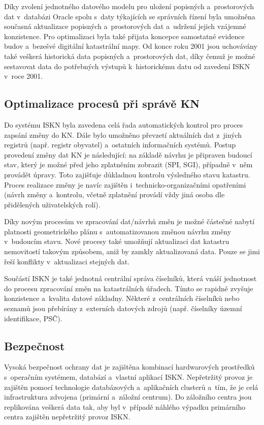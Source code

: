 \documentclass[a4paper,12pt,oneside]{book}
\begin{document}
Díky zvolení jednotného datového modelu pro uložení popisných
a~prostorových dat v~databázi Oracle spolu s~daty týkajících se
správních řízení byla umožněna současná aktualizace popisných
a~prostorových dat a~udržení jejich vzájemné konzistence. Pro
optimalizaci byla také přijata koncepce samostatné evidence budov
a~bezešvé digitální katastrální mapy. Od konce roku 2001 jsou
uchovávány také veškerá historická data popisných a~prostorových dat,
díky čemuž je možné sestavovat data do potřebných výstupů
k~historickému datu od zavedení ISKN v~roce 2001.

\subsection{Optimalizace procesů při správě KN}

Do systému ISKN byla zavedena celá řada automatických kontrol pro
proces zapsání změny do KN. Dále bylo umožněno převzetí aktuálních dat
z~jiných registrů (např. registr obyvatel) a~ostatních informačních
systémů. Postup provedení změny dat KN je následující: na základě
návrhu je připraven budoucí stav, který je možné před jeho zplatněním
zobrazit (SPI, SGI), případně v~něm provádět úpravy. Toto zajišťuje
důkladnou kontrolu výsledného stavu katastru. Proces realizace změny
je navíc zajištěn i~technicko-organizačními opatřeními (návrh změny
a~kontrolu, včetně zplatnění provádí vždy jiná osoba dle přidělených
uživatelských rolí).

Díky novým procesům ve zpracování dat/návrhů změn je možné částečné
nabytí platnosti geometrického plánu s~automatizovanou změnou návrhu
změny v~budoucím stavu. Nové procesy také umožňují aktualizaci dat
katastru nemovitostí takovým způsobem, aniž by zamkly aktualizovaná
data. Pouze se jimi řeší konflikty v~aktualizaci stejných dat.

Součástí ISKN je také jednotná centrální správa číselníků, která vnáší
jednotnost do procesu zpracování změn na katastrálních úřadech. Tímto
se rapidně zvyšuje konzistence a~kvalita datové základny. Některé
z~centrálních číselníků nebo seznamů jsou přebírány z~externích
datových zdrojů (např. číselníky územní identifikace,
PSČ).

\subsection{Bezpečnost}

Vysoká bezpečnost ochrany dat je zajištěna kombinací hardwarových
prostředků s~operačním systémem, databází a~vlastní aplikací
ISKN. Nepřetržitý provoz je zajištěn pomocí technologie databázových
a~aplikačních clusterů a~tím, že je celá infrastruktura zdvojena
(primární a~záložní centrum). Do záložního centra jsou replikována
veškerá data tak, aby byl v~případě náhlého výpadku primárního centra
zajištěn nepřetržitý provoz ISKN.
\end{document}
